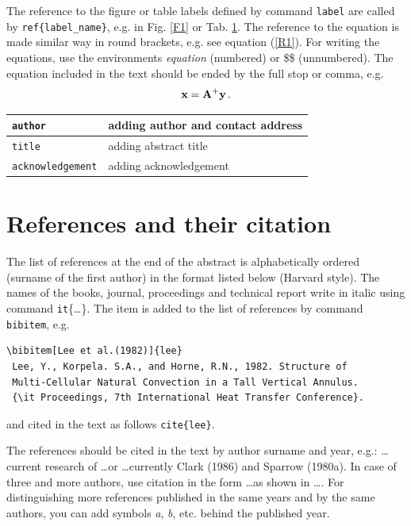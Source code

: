 \documentclass{template_svk}
\def\mtt#1{{\footnotesize\tt#1}}
\def\comm#1{\mtt{\char92#1}}
\begin{document}
The reference to the figure or table labels defined by command \comm{label} are called by \comm{ref}{\footnotesize\verb|{label_name}|}, e.g. in Fig. \ref{F1} or Tab. \ref{T1}. The reference to the equation is made similar way in round brackets, e.g. see equation (\ref{R1}). For writing the equations, use the environments {\it equation} (numbered) or \$\$ (unnumbered). The equation included in the text should be ended by the full stop or comma, e.g.
%
\begin{equation}\label{R1}
  {\bf x} =  {\bf A}^+ {\bf y}\,.
\end{equation}
%

%
\begin{table}[!ht]
  \begin{center}
    \begin{tabular}[t]{|l|l|}
      \hline
      \comm{author} & adding author and contact address \\
      \hline
      \comm{title} & adding abstract title \\
      \hline
      \comm{acknowledgement} & adding acknowledgement \\
      \hline
    \end{tabular}
  \end{center}
  \label{T1}
\end{table}


\section{References and their citation}

The list of references at the end of the abstract is alphabetically ordered (surname of the first author) in the format listed below (Harvard style). The names of the books, journal, proceedings and technical report write in italic using command \comm{it}{\footnotesize\{\dots\}}. The item is added to the list of references by command \comm{bibitem}, e.g.
%
\begin{verbatim}
\bibitem[Lee et al.(1982)]{lee}
 Lee, Y., Korpela. S.A., and Horne, R.N., 1982. Structure of
 Multi-Cellular Natural Convection in a Tall Vertical Annulus.
 {\it Proceedings, 7th International Heat Transfer Conference}.
\end{verbatim}
%
and cited in the text as follows \comm{cite}{\footnotesize\verb|{lee}|}.

The references should be cited in the text by author surname and year, e.g.: \dots current research of \cite{thung} \dots or \dots currently Clark (1986) and Sparrow (1980a). In case of three and more authors, use citation in the form \ldots as shown in \cite{lee} \dots. For distinguishing more references published in the same years and by the same authors, you can add symbols {\it a}, {\it b}, etc. behind the published year.
\end{document}
